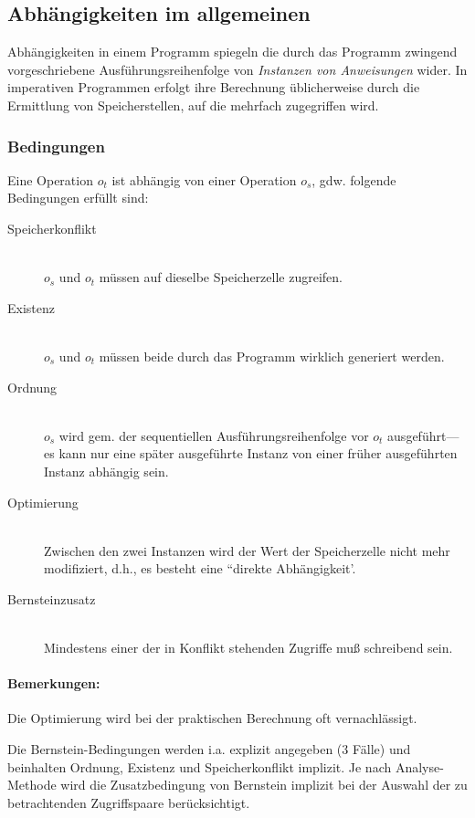 \subsection{Abhängigkeiten im allgemeinen}
Abhängigkeiten in einem Programm spiegeln die durch das Programm
zwingend vorgeschriebene Ausführungsreihenfolge von \emph{Instanzen von
Anweisungen} wider. In imperativen Programmen erfolgt ihre Berechnung
üblicherweise durch die Ermittlung von Speicherstellen, auf die mehrfach
zugegriffen wird.

\subsubsection{Bedingungen}
Eine Operation $o_t$ ist abhängig von einer Operation $o_s$, gdw. folgende Bedingungen erfüllt sind:
\begin{description}
\item[Speicherkonflikt] ~\\$o_s$ und $o_t$ müssen auf dieselbe Speicherzelle zugreifen.
\item[Existenz] ~\\$o_s$ und $o_t$ müssen beide durch das Programm wirklich generiert werden.
\item[Ordnung] ~\\$o_s$ wird gem. der sequentiellen Ausführungsreihenfolge vor $o_t$ ausgeführt---es kann nur eine später ausgeführte Instanz von einer früher ausgeführten Instanz abhängig sein.
\item[Optimierung] ~\\Zwischen den zwei Instanzen wird der Wert der Speicherzelle nicht mehr modifiziert, d.h., es besteht eine ``direkte Abhängigkeit'.
\item[Bernsteinzusatz] ~\\Mindestens einer der in Konflikt stehenden Zugriffe muß schreibend sein.
\end{description}

\paragraph{Bemerkungen:} Die Optimierung wird bei der praktischen Berechnung oft vernachlässigt.

Die Bernstein-Bedingungen werden i.a. explizit angegeben (3 Fälle) und
beinhalten Ordnung, Existenz und Speicherkonflikt implizit. Je nach
Analyse-Methode wird die Zusatzbedingung von Bernstein implizit bei der
Auswahl der zu betrachtenden Zugriffspaare berücksichtigt.


